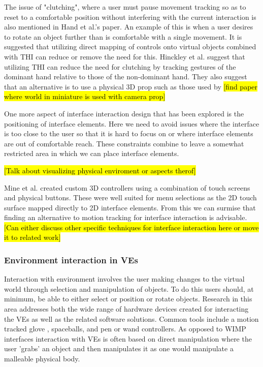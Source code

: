 \documentclass{sig-alternate-05-2015}
\begin{document}
 The issue of "clutching", where a user must pause movement tracking so as to reset to a comfortable position without interfering with the current interaction is also mentioned in Hand et al.'s paper.\cite{Hand1997} An example of this is when a user desires to rotate an object further than is comfortable with a single movement. It is suggested that utilizing direct mapping of controls onto virtual objects combined with THI can reduce or remove the need for this.\cite{Hand1997}  Hinckley et al. suggest that utilizing THI can reduce the need for clutching by tracking gestures of the dominant hand relative to those of the non-dominant hand.\cite{Hinckley1994} They also suggest that an alternative is to use a physical 3D prop such as those used by \hl{[find paper where world in miniature is used with camera prop]}
 
 One more aspect of interface interaction design that has been explored is the positioning of interface elements.\cite{alger2015visual} Here we need to avoid issues where the interface is too close to the user so that it is hard to focus on or where interface elements are out of comfortable reach. These constraints combine to leave a somewhat restricted area in which we can place interface elements.
 
 \hl{[Talk about visualizing physical enviroment or aspects therof]}
 
 Mine et al. created custom 3D controllers using a combination of touch screens and physical buttons.\cite{Mine2014} These were well suited for menu selections as the 2D touch surface mapped directly to 2D interface elements. From this we can surmise that finding an alternative to motion tracking for interface interaction is advisable. \hl{[Can either discuss other specific techniques for interface interaction here or move it to related work]}
 
 
\subsubsection{Environment interaction in VEs}
 Interaction with environment involves the user making changes to the virtual world through selection and manipulation of objects. To do this users should, at minimum, be able to either select or position or rotate objects\cite{Bowman2001}. Research in this area addresses both the wide range of hardware devices created for interacting the VEs as well as the related software solutions. Common tools include a motion tracked glove \cite{Zimmerman1986}, spaceballs\cite{Hand1997}, and pen or wand controllers\cite{Schultheis2012}. As opposed to WIMP interfaces interaction with VEs is often based on direct manipulation where the user 'grabs' an object and then manipulates it as one would manipulate a malleable physical body.
  
\end{document}
